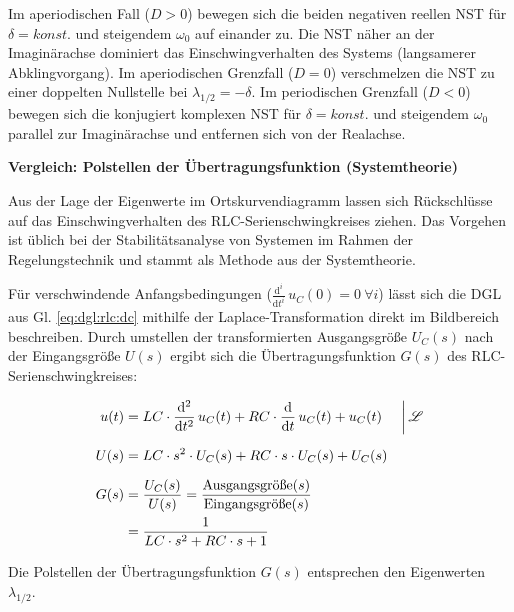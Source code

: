 \begin{frame}[t]
{    Im aperiodischen Fall ($D>0$) bewegen sich die beiden negativen reellen NST für $\delta=konst.$ und steigendem $\omega_0$ auf einander zu.
    Die NST näher an der Imaginärachse dominiert das Einschwingverhalten des Systems (langsamerer Abklingvorgang).
    Im aperiodischen Grenzfall ($D=0$) verschmelzen die NST zu einer doppelten Nullstelle bei $\lambda_{1/2}=-\delta$.
    Im periodischen Grenzfall ($D<0$) bewegen sich die konjugiert komplexen NST für $\delta=konst.$ und steigendem $\omega_0$ parallel zur Imaginärachse
    und entfernen sich von der Realachse.

    \textbf{Vergleich: Polstellen der Übertragungsfunktion (Systemtheorie)}

    Aus der Lage der Eigenwerte im Ortskurvendiagramm lassen sich Rückschlüsse auf das Einschwingverhalten des RLC-Serienschwingkreises ziehen.
    Das Vorgehen ist üblich bei der Stabilitätsanalyse von Systemen im Rahmen der Regelungstechnik und stammt als Methode aus der Systemtheorie.

    Für verschwindende Anfangsbedingungen ($\frac{\mathrm{d}^{i}}{\mathrm{d}t^{i}}\,u_C(0)=0\ \forall i$) lässt sich die DGL aus Gl. \ref{eq:dgl:rlc:dc}
    mithilfe der Laplace-Transformation direkt im Bildbereich beschreiben. Durch umstellen der transformierten Ausgangsgröße $U_C(s)$
    nach der Eingangsgröße $U(s)$ ergibt sich die Übertragungsfunktion $G(s)$ des RLC-Serienschwingkreises:

    \begin{align}
        u(t) &= LC \cdot \frac{\mathrm{d}^{2}}{\mathrm{d}t^{2}}\,u_{C}(t) + RC \cdot \frac{\mathrm{d}}{\mathrm{d}t}\,u_{C}(t) + u_{C}(t)& &\bigg|\,\mathscr{L}\\
        U(s) &= LC \cdot s^2 \cdot U_C(s) + RC \cdot s \cdot U_C(s) + U_C(s) \vphantom{\bigg|}\\
        G(s) &= \frac{U_C(s)}{U(s)} = \frac{\text{Ausgangsgröße}(s)}{\text{Eingangsgröße}(s)} \vphantom{\bigg|}\\
        &= \frac{1}{LC \cdot s^2 + RC \cdot s + 1}
    \end{align}

    Die Polstellen der Übertragungsfunktion $G(s)$ entsprechen den Eigenwerten $\lambda_{1/2}$.

}
\end{frame}
